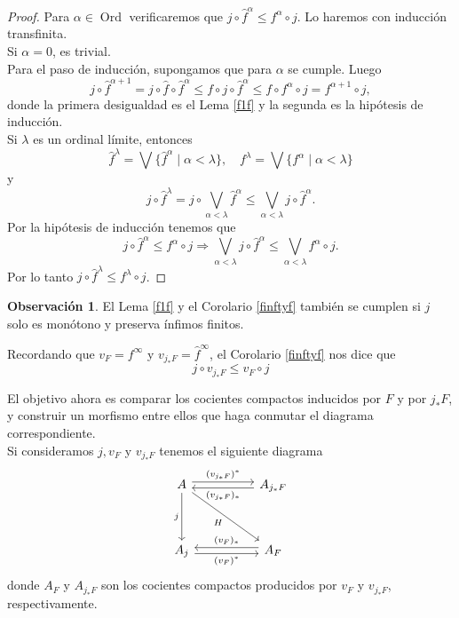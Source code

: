 \documentclass[11pt]{amsart}
\DeclareMathOperator{\Ord}{Ord}
\theoremstyle{plain}
\theoremstyle{definition}
\newtheorem{obs}[thm]{Observación}
\begin{document}
\begin{proof}
    Para $\alpha\in \Ord$ verificaremos que $j\circ \hat{f}^\alpha\leq f^\alpha\circ j$. Lo haremos con inducción transfinita.\\

    Si $\alpha=0$, es trivial.\\

    Para el paso de inducción, supongamos que para $\alpha$ se cumple. Luego
    \[
    j\circ \hat{f}^{\alpha+1}=j\circ \hat{f}\circ \hat{f}^{\alpha}\leq  f\circ j\circ \hat{f}^\alpha\leq f\circ f^\alpha\circ j=f^{\alpha+1}\circ j,
    \]
    donde la primera desigualdad es el Lema \ref{f1f} y la segunda es la hipótesis de inducción.\\

    Si $\lambda$ es un ordinal límite, entonces
	\[
	\hat{f}^\lambda=\bigvee\{\hat{f}^\alpha\mid \alpha<\lambda\}, \quad f^\lambda=\bigvee\{f^\alpha\mid \alpha<\lambda\} 
	\]
	y
	\[
		j\circ \hat{f}^\lambda=j\circ \bigvee_{\alpha<\lambda}\hat{f}^\alpha\leq\bigvee_{\alpha<\lambda}j\circ \hat{f}^\alpha.
	\]
	Por la hipótesis de inducción tenemos que 
	\[
	j\circ \hat{f}^\alpha\leq f^\alpha\circ j\Rightarrow \bigvee_{\alpha<\lambda}j\circ \hat{f}^\alpha\leq \bigvee_{\alpha<\lambda} f^\alpha\circ j.
	\]
	Por lo tanto $j\circ \hat{f}^\lambda\leq f^\lambda\circ j$.
\end{proof}

\begin{obs}\label{j monotono}
El Lema \ref{f1f} y el Corolario \ref{finftyf} también se cumplen si $j$ solo es monótono y preserva ínfimos finitos.
\end{obs}

Recordando que $v_F=f^\infty$ y $v_{j_*F}=\hat{f}^\infty$, el Corolario \ref{finftyf} nos dice que 
\[j
\circ v_{j_*F}\leq v_F\circ j
\]

El objetivo ahora es comparar los cocientes compactos inducidos por $F$ y por $j_*F$, y construir un morfismo entre ellos que haga conmutar el diagrama correspondiente.\\

Si consideramos $j, v_F$ y $v_{j_*F}$ tenemos el siguiente diagrama
\begin{equation}\label{diagrama H}
    \begin{tikzcd}
	A && {A_{j_*F}} \\
	\\
	{A_j} && {A_F}
	\arrow["{(v_{j_*F})^*}", shift left, from=1-1, to=1-3]
	\arrow["j"', from=1-1, to=3-1]
	\arrow["H"', from=1-1, to=3-3]
	\arrow["{(v_{j_*F})_*}", shift left, from=1-3, to=1-1]
	\arrow["{(v_F)^*}"', shift right, from=3-1, to=3-3]
	\arrow["{(v_F)_*}"', shift right, from=3-3, to=3-1]
\end{tikzcd}
\end{equation}
donde $A_F$ y $A_{j_*F}$ son los cocientes compactos producidos por $v_F$ y $v_{j_*F}$, respectivamente.\\
\end{document}
